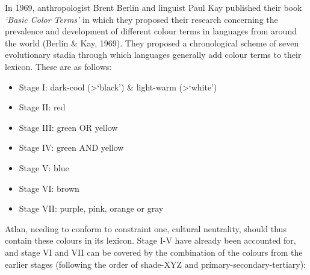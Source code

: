 
In 1969, anthropologist Brent Berlin and linguist Paul Kay published their book \textit{‘Basic Color Terms’} in which they proposed their research concerning the prevalence and development of different colour terms in languages from around  the world (Berlin \& Kay, 1969). They proposed a chronological scheme of seven evolutionary stadia through which languages generally add colour terms to their lexicon. These are as follows: 

\begin{itemize}
\item Stage I: dark-cool (>‘black’) \& light-warm (>‘white’) 

\item Stage II: red 

\item Stage III:  green OR yellow 

\item Stage IV:  green AND yellow 

\item Stage V:  blue 

\item Stage VI:  brown 

\item Stage VII:  purple, pink, orange or gray 
\end{itemize}

Atlan, needing to conform to constraint one, cultural neutrality, should thus contain these colours in its lexicon. Stage I-V have already been accounted for, and stage VI and VII can be covered by the combination of the colours from the earlier stages (following the order of shade-XYZ and primary-secondary-tertiary): 


